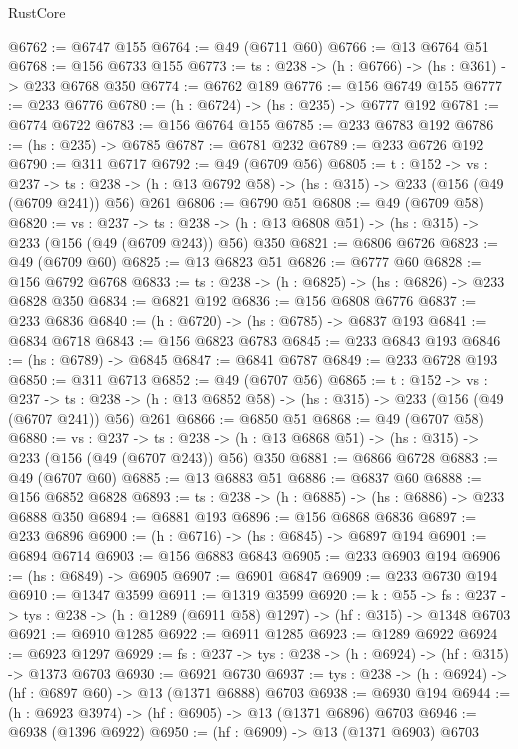 \begin{lexlean}{RustCore}
\begin{coremodule}
@6762 := @6747 @155
@6764 := @49 (@6711 @60)
@6766 := @13 @6764 @51
@6768 := @156 @6733 @155
@6773 := {ts : @238} -> (h : @6766) -> (hs : @361) -> @233 @6768 @350
@6774 := @6762 @189
@6776 := @156 @6749 @155
@6777 := @233 @6776
@6780 := (h : @6724) -> (hs : @235) -> @6777 @192
@6781 := @6774 @6722
@6783 := @156 @6764 @155
@6785 := @233 @6783 @192
@6786 := (hs : @235) -> @6785
@6787 := @6781 @232
@6789 := @233 @6726 @192
@6790 := @311 @6717
@6792 := @49 (@6709 @56)
@6805 := {t : @152} ->
  {vs : @237} ->
  {ts : @238} -> (h : @13 @6792 @58) -> (hs : @315) -> @233 (@156 (@49 (@6709 @241)) @56) @261
@6806 := @6790 @51
@6808 := @49 (@6709 @58)
@6820 := {vs : @237} ->
  {ts : @238} -> (h : @13 @6808 @51) -> (hs : @315) -> @233 (@156 (@49 (@6709 @243)) @56) @350
@6821 := @6806 @6726
@6823 := @49 (@6709 @60)
@6825 := @13 @6823 @51
@6826 := @6777 @60
@6828 := @156 @6792 @6768
@6833 := {ts : @238} -> (h : @6825) -> (hs : @6826) -> @233 @6828 @350
@6834 := @6821 @192
@6836 := @156 @6808 @6776
@6837 := @233 @6836
@6840 := (h : @6720) -> (hs : @6785) -> @6837 @193
@6841 := @6834 @6718
@6843 := @156 @6823 @6783
@6845 := @233 @6843 @193
@6846 := (hs : @6789) -> @6845
@6847 := @6841 @6787
@6849 := @233 @6728 @193
@6850 := @311 @6713
@6852 := @49 (@6707 @56)
@6865 := {t : @152} ->
  {vs : @237} ->
  {ts : @238} -> (h : @13 @6852 @58) -> (hs : @315) -> @233 (@156 (@49 (@6707 @241)) @56) @261
@6866 := @6850 @51
@6868 := @49 (@6707 @58)
@6880 := {vs : @237} ->
  {ts : @238} -> (h : @13 @6868 @51) -> (hs : @315) -> @233 (@156 (@49 (@6707 @243)) @56) @350
@6881 := @6866 @6728
@6883 := @49 (@6707 @60)
@6885 := @13 @6883 @51
@6886 := @6837 @60
@6888 := @156 @6852 @6828
@6893 := {ts : @238} -> (h : @6885) -> (hs : @6886) -> @233 @6888 @350
@6894 := @6881 @193
@6896 := @156 @6868 @6836
@6897 := @233 @6896
@6900 := (h : @6716) -> (hs : @6845) -> @6897 @194
@6901 := @6894 @6714
@6903 := @156 @6883 @6843
@6905 := @233 @6903 @194
@6906 := (hs : @6849) -> @6905
@6907 := @6901 @6847
@6909 := @233 @6730 @194
@6910 := @1347 @3599
@6911 := @1319 @3599
@6920 := {k : @55} ->
  {fs : @237} -> {tys : @238} -> (h : @1289 (@6911 @58) @1297) -> (hf : @315) -> @1348 @6703
@6921 := @6910 @1285
@6922 := @6911 @1285
@6923 := @1289 @6922
@6924 := @6923 @1297
@6929 := {fs : @237} -> {tys : @238} -> (h : @6924) -> (hf : @315) -> @1373 @6703
@6930 := @6921 @6730
@6937 := {tys : @238} -> (h : @6924) -> (hf : @6897 @60) -> @13 (@1371 @6888) @6703
@6938 := @6930 @194
@6944 := (h : @6923 @3974) -> (hf : @6905) -> @13 (@1371 @6896) @6703
@6946 := @6938 (@1396 @6922)
@6950 := (hf : @6909) -> @13 (@1371 @6903) @6703

\end{coremodule}
\end{lexlean}
